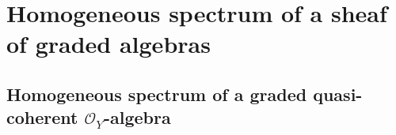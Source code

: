 \section{Homogeneous spectrum of a sheaf of graded algebras}
\label{section:2.3}


\subsection{Homogeneous spectrum of a graded quasi-coherent $\mathcal{O}_Y$-algebra}
\label{subsection:2.3.1}














